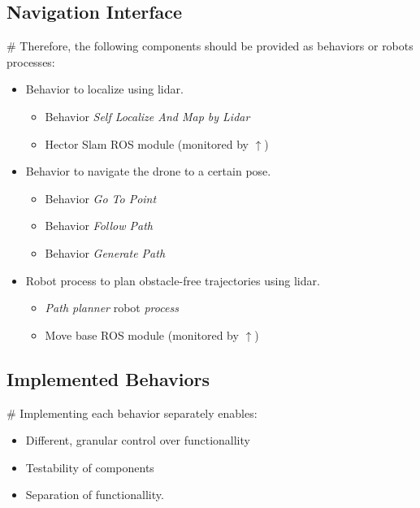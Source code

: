 \documentclass[]{beamer}
\def\mOrangeItem{\item[\textcolor{orange}{\textbullet}]}
\newcommand{\mSlideTitle}{{{\color{gray}\secname}} \# \subsecname}
\begin{document}
\subsection{Navigation Interface}
\begin{frame}{\mSlideTitle}
  Therefore, the following components should be provided as behaviors or robots processes:
  \begin{itemize}
    \mOrangeItem \alert{Behavior} to localize using lidar.
      \begin{itemize}
        \item Behavior \emph{Self Localize And Map by Lidar}
        \item Hector Slam ROS module (monitored by $\uparrow$)
      \end{itemize}
    \mOrangeItem \alert{Behavior} to navigate the drone to a certain pose.
      \begin{itemize}
        \item Behavior \emph{Go To Point}
        \item Behavior \emph{Follow Path}
        \item Behavior \emph{Generate Path}
      \end{itemize}
    \mOrangeItem \alert{Robot process} to plan obstacle-free trajectories using lidar.
      \begin{itemize}
        \item \emph{Path planner} robot \emph{process}
        \item Move base ROS module (monitored by $\uparrow$)
      \end{itemize}
  \end{itemize}
\end{frame}

\subsection{Implemented Behaviors}
\begin{frame}{\mSlideTitle}
  Implementing each behavior separately enables:
  \begin{itemize}
    \item Different, granular control over functionallity
    \item Testability of components
    \item Separation of functionallity.
  \end{itemize}
\end{frame}

\end{document}
